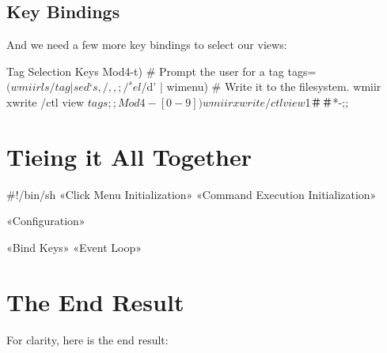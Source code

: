 \subsection{Key Bindings}

And we need a few more key bindings to select our views:

\begin{Fragment}{Tag Selection Keys}
  Mod4-t)
    # Prompt the user for a tag
    tags=$(wmiir ls /tag | sed ‘s,/,,; /^sel$/d’ | wimenu)
    # Write it to the filesystem.
    wmiir xwrite /ctl view $tags;;
  Mod4-[0-9])
    wmiir xwrite /ctl view ${1＃＃*-};;
\end{Fragment}

\section{Tieing it All Together}

\begin{code}
  #!/bin/sh
  «Click Menu Initialization»
  «Command Execution Initialization»

  «Configuration»

  «Bind Keys»
  «Event Loop»
\end{code}

\section{The End Result}

For clarity, here is the end result:

